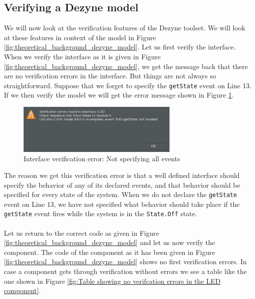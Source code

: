 \documentclass[12pt]{scrreprt}
\begin{document}
\subsection{Verifying a Dezyne model}
\label{Verifying a Dezyne model}
We will now look at the verification features of the Dezyne toolset. We will look at these features in context of the model in Figure \ref{fig:theoretical_background_dezyne_model}. Let us first verify the interface. When we verify the interface as it is given in Figure \ref{fig:theoretical_background_dezyne_model}, we get the message back that there are no verification errors in the interface. But things are not always so straightforward. Suppose that we forget to specify the \texttt{getState} event on Line 13. If we then verify the model we will get the error message shown in Figure \ref{fig:not_specifying_all_events_error}.

\begin{figure}[H]
    \centering
    \includegraphics[width=0.7\textwidth]{Figures/theoretical_background/verification_of_interface_error.png}
    \caption{Interface verification error: Not specifying all events}
    \label{fig:not_specifying_all_events_error}
\end{figure}

The reason we get this verification error is that a well defined interface should specify the behavior of any of its declared events, and that behavior should be specified for every state of the system. When we do not declare the \texttt{getState} event on Line 13, we have not specified what behavior should take place if the \texttt{getState} event fires while the system is in the \texttt{State.Off} state.
\\\\
Let us return to the correct code as given in Figure \ref{fig:theoretical_background_dezyne_model} and let us now verify the component. The code of the component as it has been given in Figure \ref{fig:theoretical_background_dezyne_model} shows no first verification errors. In case a component gets through verification without errors we see a table like the one shown in Figure \ref{fig:Table showing no verifcation errors in the LED component}.
\end{document}
